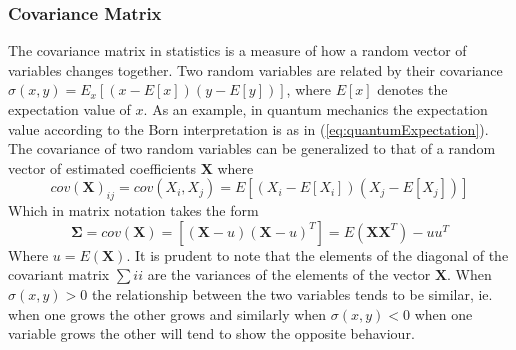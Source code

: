 \subsubsection{Covariance Matrix}
The covariance matrix in statistics is a measure of how a random vector of variables changes together. Two random variables are related by their covariance $\sigma(x,y) = E_x \left[(x-E[x])(y-E[y])\right]$, where $E[x]$ denotes the expectation value of $x$. As an example, in quantum mechanics the expectation value according to the Born interpretation is as in (\ref{eq:quantumExpectation}). The covariance of two random variables can be generalized to that of a random vector of estimated coefficients $\mathbf{X}$ where \cite{covariance}
\begin{equation}
cov(\mathbf{X})_{ij} = cov(X_i,X_j) = E[(X_i-E[X_i])(X_j-E[X_j])]
\end{equation}
Which in matrix notation takes the form 
\begin{equation}
\mathbf{\Sigma} = cov(\mathbf{X}) = [(\mathbf{X}- u)(\mathbf{X}-u)^T] = E(\mathbf{X}\mathbf{X}^T) - uu^T
\label{eq:covarianceMatrix}
\end{equation}
Where $u=E(\mathbf{X})$. It is prudent to note that the elements of the diagonal of the covariant matrix $\sum{ii}$ are the variances of the elements of the vector $\mathbf{X}$. When $\sigma(x,y)>0$ the relationship between the two variables tends to be similar, ie. when one grows the other grows and similarly when $\sigma(x,y)<0$ when one variable grows the other will tend to show the opposite behaviour.\cite{covariance}  

